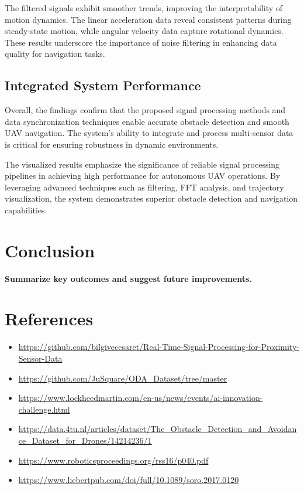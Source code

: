 \documentclass[12pt,a4paper]{article}
\begin{document}
The filtered signals exhibit smoother trends, improving the interpretability of motion dynamics. The linear acceleration data reveal consistent patterns during steady-state motion, while angular velocity data capture rotational dynamics. These results underscore the importance of noise filtering in enhancing data quality for navigation tasks.

\subsection{Integrated System Performance}

Overall, the findings confirm that the proposed signal processing methods and data synchronization techniques enable accurate obstacle detection and smooth UAV navigation. The system's ability to integrate and process multi-sensor data is critical for ensuring robustness in dynamic environments. 

The visualized results emphasize the significance of reliable signal processing pipelines in achieving high performance for autonomous UAV operations. By leveraging advanced techniques such as filtering, FFT analysis, and trajectory visualization, the system demonstrates superior obstacle detection and navigation capabilities.

\section{Conclusion}
\textbf{Summarize key outcomes and suggest future improvements.}

\section*{References}
\begin{itemize}
    \item \url{https://github.com/bilgivecesaret/Real-Time-Signal-Processing-for-Proximity-Sensor-Data}
    \item \url{https://github.com/JuSquare/ODA_Dataset/tree/master}
    \item \url{https://www.lockheedmartin.com/en-us/news/events/ai-innovation-challenge.html}
    \item \url{https://data.4tu.nl/articles/dataset/The_Obstacle_Detection_and_Avoidance_Dataset_for_Drones/14214236/1}
    \item  \url{https://www.roboticsproceedings.org/rss16/p040.pdf}
    \item \url{https://www.liebertpub.com/doi/full/10.1089/soro.2017.0120}   
\end{itemize}
\end{document}
